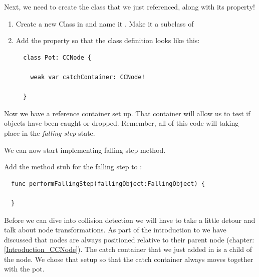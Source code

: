 Next, we need to create the  class that we just referenced,
along with its  property!

\begin{leftbar}
\begin{enumerate}
  \item Create a new Class in \xcode{} and name it . Make it a
  subclass of \ccnode{}
  \item Add the  property so that the class
  definition looks like this:
  \begin{lstlisting}
  class Pot: CCNode {
  
    weak var catchContainer: CCNode!
  
  }
  \end{lstlisting}
\end{enumerate}
\end{leftbar}
Now we have a reference container set up. That container will allow us to test
if objects have been caught or dropped. Remember, all of this code will taking
place in the \textit{falling step} state. 

We can now start implementing falling step method.
\begin{leftbar}
Add the method stub for the falling step to :
\begin{lstlisting}
  func performFallingStep(fallingObject:FallingObject) {

  }
\end{lstlisting}
\end{leftbar}
Before we can dive into collision detection we will have to take a little detour
and talk about node transformations. As
part of the introduction to \cocos{} we have discussed that nodes are always positioned
relative to their parent node (chapter: \ref{Introduction_CCNode}). The catch
container that we just added in \SB{} is a child of the 
node. We chose that setup so that the catch container always moves together
with the pot. 

